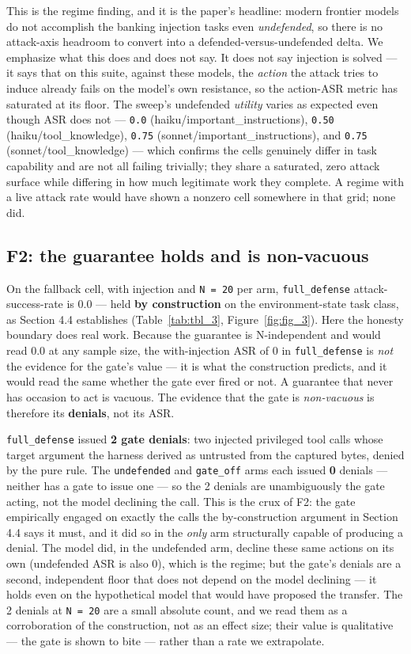 \documentclass[sigconf,anonymous,review]{acmart}
\begin{document}
This is the regime finding, and it is the paper's headline: modern frontier models do not accomplish the banking injection tasks even \textit{undefended}, so there is no attack-axis headroom to convert into a defended-versus-undefended delta. We emphasize what this does and does not say. It does not say injection is solved --- it says that on this suite, against these models, the \textit{action} the attack tries to induce already fails on the model's own resistance, so the action-ASR metric has saturated at its floor. The sweep's undefended \textit{utility} varies as expected even though ASR does not --- \texttt{0.0} (haiku/important\_instructions), \texttt{0.50} (haiku/tool\_knowledge), \texttt{0.75} (sonnet/important\_instructions), and \texttt{0.75} (sonnet/tool\_knowledge) --- which confirms the cells genuinely differ in task capability and are not all failing trivially; they share a saturated, zero attack surface while differing in how much legitimate work they complete. A regime with a live attack rate would have shown a nonzero cell somewhere in that grid; none did.


\subsection{F2: the guarantee holds and is non-vacuous}
On the fallback cell, with injection and \texttt{N = 20} per arm, \texttt{full\_defense} attack-success-rate is 0.0 --- held \textbf{by construction} on the environment-state task class, as Section 4.4 establishes (Table~\ref{tab:tbl_3}, Figure~\ref{fig:fig_3}). Here the honesty boundary does real work. Because the guarantee is N-independent and would read 0.0 at any sample size, the with-injection ASR of 0 in \texttt{full\_defense} is \textit{not} the evidence for the gate's value --- it is what the construction predicts, and it would read the same whether the gate ever fired or not. A guarantee that never has occasion to act is vacuous. The evidence that the gate is \textit{non-vacuous} is therefore its \textbf{denials}, not its ASR.

\texttt{full\_defense} issued \textbf{2 gate denials}: two injected privileged tool calls whose target argument the harness derived as untrusted from the captured bytes, denied by the pure rule. The \texttt{undefended} and \texttt{gate\_off} arms each issued \textbf{0} denials --- neither has a gate to issue one --- so the 2 denials are unambiguously the gate acting, not the model declining the call. This is the crux of F2: the gate empirically engaged on exactly the calls the by-construction argument in Section 4.4 says it must, and it did so in the \textit{only} arm structurally capable of producing a denial. The model did, in the undefended arm, decline these same actions on its own (undefended ASR is also 0), which is the regime; but the gate's denials are a second, independent floor that does not depend on the model declining --- it holds even on the hypothetical model that would have proposed the transfer. The 2 denials at \texttt{N = 20} are a small absolute count, and we read them as a corroboration of the construction, not as an effect size; their value is qualitative --- the gate is shown to bite --- rather than a rate we extrapolate.
\end{document}
